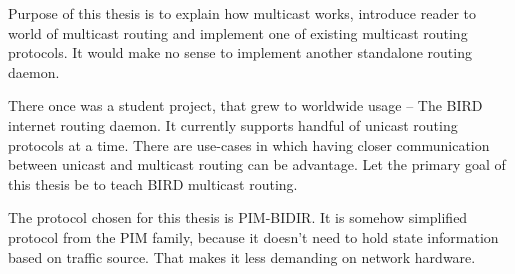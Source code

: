 Purpose of this thesis is to explain how multicast works, introduce reader to
world of multicast routing and implement one of existing multicast routing
protocols. It would make no sense to implement another standalone routing
daemon.

There once was a student project, that grew to worldwide usage -- The BIRD
internet routing daemon. It currently supports handful of unicast routing
protocols at a time. There are use-cases in which having closer communication
between unicast and multicast routing can be advantage. Let the primary goal of
this thesis be to teach BIRD multicast routing.

The protocol chosen for this thesis is PIM-BIDIR. It is somehow simplified
protocol from the PIM family, because it doesn't need to hold state information
based on traffic source. That makes it less demanding on network hardware.
